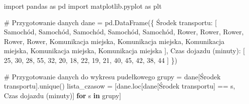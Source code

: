 \documentclass[
  polish,
  letterpaper,
  DIV=11,
  numbers=noendperiod]{scrreprt}
\newenvironment{Shaded}{\begin{snugshade}}{\end{snugshade}}
\newcommand{\CommentTok}[1]{\textcolor[rgb]{0.37,0.37,0.37}{#1}}
\newcommand{\ControlFlowTok}[1]{\textcolor[rgb]{0.00,0.23,0.31}{\textbf{#1}}}
\newcommand{\DecValTok}[1]{\textcolor[rgb]{0.68,0.00,0.00}{#1}}
\newcommand{\ImportTok}[1]{\textcolor[rgb]{0.00,0.46,0.62}{#1}}
\newcommand{\KeywordTok}[1]{\textcolor[rgb]{0.00,0.23,0.31}{\textbf{#1}}}
\newcommand{\NormalTok}[1]{\textcolor[rgb]{0.00,0.23,0.31}{#1}}
\newcommand{\OperatorTok}[1]{\textcolor[rgb]{0.37,0.37,0.37}{#1}}
\newcommand{\StringTok}[1]{\textcolor[rgb]{0.13,0.47,0.30}{#1}}
\begin{document}
\begin{Shaded}
\begin{Highlighting}[]
\ImportTok{import}\NormalTok{ pandas }\ImportTok{as}\NormalTok{ pd}
\ImportTok{import}\NormalTok{ matplotlib.pyplot }\ImportTok{as}\NormalTok{ plt}

\CommentTok{\# Przygotowanie danych}
\NormalTok{dane }\OperatorTok{=}\NormalTok{ pd.DataFrame(\{}
    \StringTok{\textquotesingle{}Środek transportu\textquotesingle{}}\NormalTok{: [}
        \StringTok{\textquotesingle{}Samochód\textquotesingle{}}\NormalTok{, }\StringTok{\textquotesingle{}Samochód\textquotesingle{}}\NormalTok{, }\StringTok{\textquotesingle{}Samochód\textquotesingle{}}\NormalTok{, }\StringTok{\textquotesingle{}Samochód\textquotesingle{}}\NormalTok{, }\StringTok{\textquotesingle{}Samochód\textquotesingle{}}\NormalTok{,}
        \StringTok{\textquotesingle{}Rower\textquotesingle{}}\NormalTok{,    }\StringTok{\textquotesingle{}Rower\textquotesingle{}}\NormalTok{,    }\StringTok{\textquotesingle{}Rower\textquotesingle{}}\NormalTok{,    }\StringTok{\textquotesingle{}Rower\textquotesingle{}}\NormalTok{,    }\StringTok{\textquotesingle{}Rower\textquotesingle{}}\NormalTok{,}
        \StringTok{\textquotesingle{}Komunikacja miejska\textquotesingle{}}\NormalTok{, }\StringTok{\textquotesingle{}Komunikacja miejska\textquotesingle{}}\NormalTok{, }\StringTok{\textquotesingle{}Komunikacja miejska\textquotesingle{}}\NormalTok{, }\StringTok{\textquotesingle{}Komunikacja miejska\textquotesingle{}}\NormalTok{, }\StringTok{\textquotesingle{}Komunikacja miejska\textquotesingle{}}
\NormalTok{    ],}
    \StringTok{\textquotesingle{}Czas dojazdu (minuty)\textquotesingle{}}\NormalTok{: [}
        \DecValTok{25}\NormalTok{, }\DecValTok{30}\NormalTok{, }\DecValTok{28}\NormalTok{, }\DecValTok{55}\NormalTok{, }\DecValTok{32}\NormalTok{,}
        \DecValTok{20}\NormalTok{, }\DecValTok{18}\NormalTok{, }\DecValTok{22}\NormalTok{, }\DecValTok{19}\NormalTok{, }\DecValTok{21}\NormalTok{,}
        \DecValTok{40}\NormalTok{, }\DecValTok{45}\NormalTok{, }\DecValTok{42}\NormalTok{, }\DecValTok{38}\NormalTok{, }\DecValTok{44}
\NormalTok{    ]}
\NormalTok{\})}

\CommentTok{\# Przygotowanie danych do wykresu pudełkowego}
\NormalTok{grupy }\OperatorTok{=}\NormalTok{ dane[}\StringTok{\textquotesingle{}Środek transportu\textquotesingle{}}\NormalTok{].unique()}
\NormalTok{lista\_czasow }\OperatorTok{=}\NormalTok{ [dane.loc[dane[}\StringTok{\textquotesingle{}Środek transportu\textquotesingle{}}\NormalTok{] }\OperatorTok{==}\NormalTok{ s, }\StringTok{\textquotesingle{}Czas dojazdu (minuty)\textquotesingle{}}\NormalTok{]}
                \ControlFlowTok{for}\NormalTok{ s }\KeywordTok{in}\NormalTok{ grupy]}


\end{Highlighting}
\end{Shaded}
\end{document}
